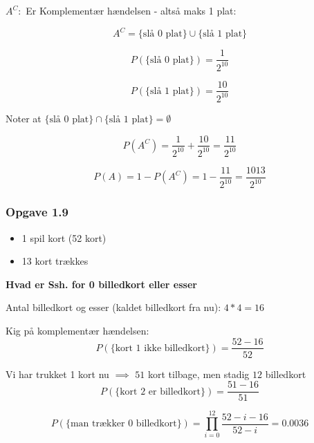 $A^C :$ Er Komplementær hændelsen - altså maks 1 plat:

\begin{equation}
    A^C = \{\text{slå 0 plat} \} \cup \{\text{slå 1 plat} \}
\end{equation}

\begin{equation}
    P(\{\text{slå 0 plat}\}) = \frac{1}{2^{10}}
\end{equation}

\begin{equation}
    P(\{\text{slå 1 plat}\}) = \frac{10}{2^{10}}
\end{equation}

Noter at $\{\text{slå 0 plat}\} \cap \{\text{slå 1 plat}\} = \emptyset$

\begin{equation}
    P(A^C)=\frac{1}{2^{10}} + \frac{10}{2^{10}} = \frac{11}{2^{10}}
\end{equation}

\begin{equation}
    P(A) = 1 - P(A^C) = 1 - \frac{11}{2^{10}} = \frac{1013}{2^{10}}
\end{equation}

\subsubsection{Opgave 1.9}

\begin{itemize}
    \item 1 spil kort (52 kort)
    \item 13 kort trækkes
\end{itemize}

\textbf{Hvad er Ssh. for 0 billedkort eller esser}

Antal billedkort og esser (kaldet billedkort fra nu): $4*4=16$

Kig på komplementær hændelsen:
\begin{equation}
    P(\{\text{kort 1 ikke billedkort}\}) = \frac{52 - 16}{52}
\end{equation}

Vi har trukket 1 kort nu $\implies$ $51$ kort tilbage, men stadig $12$ billedkort
\begin{equation}
    P(\{\text{kort 2 er billedkort}\}) = \frac{51 - 16}{51}
\end{equation}

\begin{equation}
    P(\{\text{man trækker 0 billedkort}\}) = \prod_{i=0}^{12} \frac{52 - i - 16}{52 - i} = 0.0036
\end{equation}

